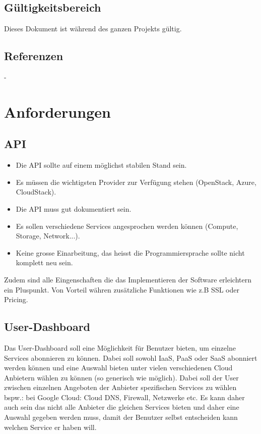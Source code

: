 \documentclass[11pt]{scrartcl}
\begin{document}
\subsection{Gültigkeitsbereich}
Dieses Dokument ist während des ganzen Projekts gültig.


\subsection{Referenzen}
-

\section{Anforderungen}
\subsection{API}
\begin{itemize}
\item Die API sollte auf einem möglichst stabilen Stand sein.
\item Es müssen die wichtigsten Provider zur Verfügung stehen (OpenStack, Azure, CloudStack).
\item Die API muss gut dokumentiert sein.
\item Es sollen verschiedene Services angesprochen werden können (Compute, Storage, Network...).
\item Keine grosse Einarbeitung, das heisst die Programmiersprache sollte nicht komplett neu sein.
\end{itemize}

Zudem sind alle Eingenschaften die das Implementieren der Software erleichtern ein Pluspunkt. Von Vorteil währen zusätzliche Funktionen wie z.B SSL oder Pricing. 

\subsection{User-Dashboard}
Das User-Dashboard soll eine Möglichkeit für Benutzer bieten, um einzelne Services 
abonnieren zu können.
Dabei soll sowohl IaaS, PaaS oder SaaS abonniert werden können und eine Auswahl 
bieten unter vielen verschiedenen Cloud Anbietern wählen zu können (so generisch wie 
möglich).
Dabei soll der User zwischen einzelnen Angeboten der Anbieter spezifischen 
Services zu wählen bspw.: bei Google Cloud: Cloud DNS, Firewall, Netzwerke etc.
Es kann daher auch sein das nicht alle Anbieter die gleichen Services bieten und 
daher eine Auswahl gegeben werden muss, damit der Benutzer selbst entscheiden 
kann welchen Service er haben will.
\end{document}
